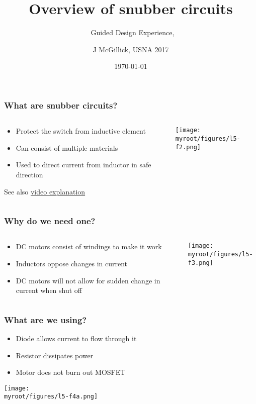 \documentclass[aspectratio=169]{beamer}
\title{Overview of snubber circuits}
\subtitle{\usnaCourseNumber\ Guided Design Experience, \usnaCourseTerm}
\author{J McGillick, USNA 2017}
\date{\today}
\newcommand{\myroot}{../..}
\begin{document}
\settitlebg
\begin{frame}
\titlepage
\end{frame}

\setslidebg
\begin{frame}
\frametitle{What are snubber circuits?}
\begin{columns}
\begin{column}{0.5\textwidth}
\begin{itemize}
\item Protect the switch from inductive element
\item Can consist of multiple materials
\item Used to direct current from inductor in safe direction
\end{itemize}
See also \href{https://www.youtube.com/watch?v=LXGtE3X2k7Y}{video explanation}
\end{column}
\begin{column}{0.5\textwidth}
\begin{center}
\texttt{[image: \\myroot/figures/l5-f2.png]}
\end{center}
\end{column}
\end{columns}
\end{frame}

\begin{frame}
\frametitle{Why do we need one?}
\begin{columns}
\begin{column}{0.5\textwidth}
\begin{itemize}
\item DC motors consist of windings to make it work
\item Inductors oppose changes in current
\item DC motors will not allow for sudden change in current when shut off
\end{itemize}
\end{column}
\begin{column}{0.5\textwidth}
\begin{center}
\texttt{[image: \\myroot/figures/l5-f3.png]}
\end{center}
\end{column}
\end{columns}
\end{frame}

\begin{frame}
\frametitle{What are we using?}
\begin{itemize}
\item Diode allows current to flow through it
\item Resistor dissipates power
\item Motor does not burn out MOSFET
\end{itemize}
\begin{center}
\texttt{[image: \\myroot/figures/l5-f4a.png]}
\end{center}
\end{frame}
\end{document}
